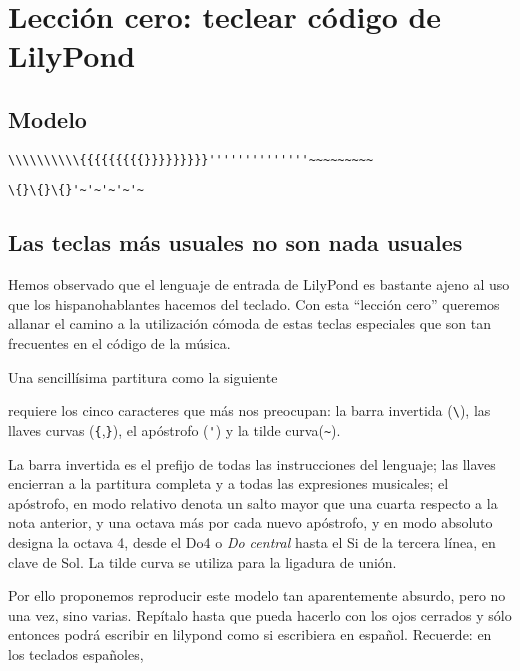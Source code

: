\section{Lección cero: teclear código de LilyPond}

\subsection{Modelo}
\verb+\\\\\\\\\\{{{{{{{{{}}}}}}}}}''''''''''''''~~~~~~~~~+

\verb+\{}\{}\{}'~'~'~'~'~+

\subsection{Las teclas más usuales no son nada usuales}

Hemos observado que el lenguaje de entrada de LilyPond es bastante
ajeno al uso que los hispanohablantes hacemos del teclado. Con esta
``lección cero'' queremos allanar el camino a la utilización cómoda de
estas teclas especiales que son tan frecuentes en el código de la
música.

Una sencillísima partitura como la siguiente


requiere los cinco caracteres que más nos preocupan: la barra
invertida (\verb+\+), las llaves curvas (\verb+{+,\verb+}+), el
apóstrofo (\verb+'+) y la tilde curva(\verb+~+).

La barra invertida es el prefijo de todas las instrucciones del
lenguaje; las llaves encierran a la partitura completa y a todas las
expresiones musicales; el apóstrofo, en modo relativo denota un salto
mayor que una cuarta respecto a la nota anterior, y una octava más por
cada nuevo apóstrofo, y en modo absoluto designa la octava 4, desde el
Do4 o \emph{Do central} hasta el Si de la tercera línea, en clave de
Sol. La tilde curva se utiliza para la ligadura de unión.

Por ello proponemos reproducir este modelo tan aparentemente absurdo,
pero no una vez, sino varias. Repítalo hasta que pueda hacerlo con los
ojos cerrados y sólo entonces podrá escribir en lilypond como si
escribiera en español. Recuerde: en los teclados españoles,

